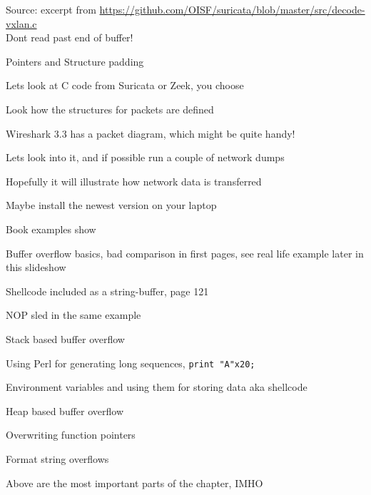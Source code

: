 \documentclass[Screen16to9,17pt]{foils}
\begin{document}
Source: excerpt from \url{https://github.com/OISF/suricata/blob/master/src/decode-vxlan.c}\\
Dont read past end of buffer!



\begin{list2}
\item Pointers and Structure padding
\item Lets look at C code from Suricata or Zeek, you choose
\item Look how the structures for packets are defined
\end{list2}




\begin{list2}
\item Wireshark 3.3 has a packet diagram, which might be quite handy!
\item Lets look into it, and if possible run a couple of network dumps
\item Hopefully it will illustrate how network data is transferred
\item Maybe install the newest version on your laptop
\end{list2}





Book examples show
\begin{list2}
\item Buffer overflow basics, bad comparison in first pages, see real life example later in this slideshow
\item Shellcode included as a string-buffer, page 121
\item NOP sled in the same example
\item Stack based buffer overflow
\item Using Perl for generating long sequences, \verb+print "A"x20;+
\item Environment variables and using them for storing data aka shellcode
\item Heap based buffer overflow
\item Overwriting function pointers
\item Format string overflows
\item Above are the most important parts of the chapter, IMHO
\end{list2}
\end{document}
